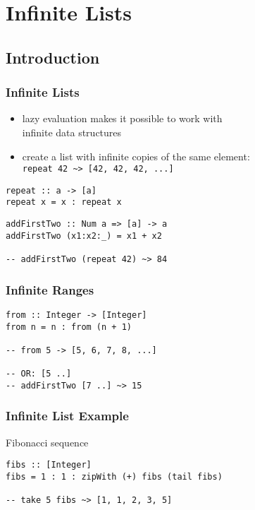 \documentclass[dvipsnames]{beamer}
\theoremstyle{plain}
\begin{document}
\section{Infinite Lists}

\subsection{Introduction}

\begin{frame}[fragile]
  \frametitle{Infinite Lists}

  \begin{itemize}
    \item lazy evaluation makes it possible to work with\\
      infinite data structures
    \item create a list with infinite copies of the same element:\\
      \lstinline|repeat 42 ~> [42, 42, 42, ...]|
  \end{itemize}

  \begin{exampleblock}{}
    \begin{lstlisting}[deletekeywords={repeat}]
repeat :: a -> [a]
repeat x = x : repeat x
    \end{lstlisting}

    \pause
    \medskip
    \begin{lstlisting}
addFirstTwo :: Num a => [a] -> a
addFirstTwo (x1:x2:_) = x1 + x2

-- addFirstTwo (repeat 42) ~> 84
    \end{lstlisting}
  \end{exampleblock}
\end{frame}

\begin{frame}[fragile]
  \frametitle{Infinite Ranges}

  \begin{lstlisting}
from :: Integer -> [Integer]
from n = n : from (n + 1)

-- from 5 -> [5, 6, 7, 8, ...]

-- OR: [5 ..]
-- addFirstTwo [7 ..] ~> 15
  \end{lstlisting}
\end{frame}

\begin{frame}[fragile]
  \frametitle{Infinite List Example}

  \begin{exampleblock}{Fibonacci sequence}
    \begin{lstlisting}
fibs :: [Integer]
fibs = 1 : 1 : zipWith (+) fibs (tail fibs)

-- take 5 fibs ~> [1, 1, 2, 3, 5]
    \end{lstlisting}


  \end{exampleblock}
\end{frame}
\end{document}
